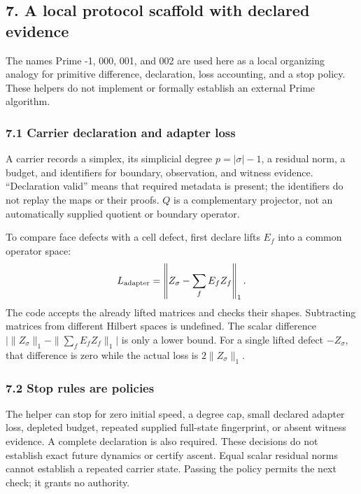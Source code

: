 \documentclass[
  11pt,
]{article}
\begin{document}
\subsection{7. A local protocol scaffold with declared evidence}\label{a-local-protocol-scaffold-with-declared-evidence}

The names Prime -1, 000, 001, and 002 are used here as a local organizing
analogy for primitive difference, declaration, loss accounting, and a stop
policy. These helpers do not implement or formally establish an external
Prime algorithm.

\subsubsection{7.1 Carrier declaration and adapter loss}\label{carrier-declaration-and-adapter-loss}

A carrier records a simplex, its simplicial degree \(p=|\sigma|-1\), a
residual norm, a budget, and identifiers for boundary, observation, and
witness evidence. ``Declaration valid'' means that required metadata is
present; the identifiers do not replay the maps or their proofs.
\(Q\) is a complementary projector, not an automatically supplied quotient
or boundary operator.

To compare face defects with a cell defect, first declare lifts \(E_f\)
into a common operator space:
\[
L_{\rm adapter}=
\left\|Z_\sigma-\sum_f E_fZ_f\right\|_1.
\]
The code accepts the already lifted matrices and checks their shapes.
Subtracting matrices from different Hilbert spaces is undefined.
The scalar difference
\(\bigl|\|Z_\sigma\|_1-\|\sum_fE_fZ_f\|_1\bigr|\) is only a lower bound.
For a single lifted defect \(-Z_\sigma\), that difference is zero while
the actual loss is \(2\|Z_\sigma\|_1\).

\subsubsection{7.2 Stop rules are policies}\label{stop-rules-are-policies}

The helper can stop for zero initial speed, a degree cap, small declared
adapter loss, depleted budget, repeated supplied full-state fingerprint,
or absent witness evidence. A complete declaration is also required.
These decisions do not establish exact future dynamics or certify ascent.
Equal scalar residual norms cannot establish a repeated carrier state.
Passing the policy permits the next check; it grants no authority.
\end{document}
